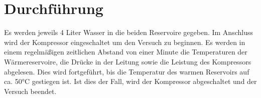 \section{Durchführung}
\label{sec:Durchführung}
Es werden jeweils 4 Liter Wasser in die beiden Reservoire gegeben. Im Anschluss
wird der Kompressor eingeschaltet um den Versuch zu beginnen. Es werden in einem
regelmäßigen zeitlichen Abstand von einer Minute die Temperaturen der Wärmereservoire,
die Drücke in der Leitung sowie die Leistung des Kompressors abgelesen. Dies wird
fortgeführt, bis die Temperatur des warmen Reservoirs auf ca. 50°C gestiegen ist.
Ist dies der Fall, wird der Kompressor abgeschaltet und der Versuch beendet.
